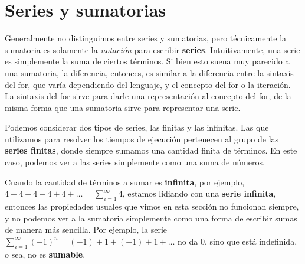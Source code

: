 \section{Series y sumatorias}
Generalmente no distinguimos entre series y sumatorias, pero técnicamente la sumatoria es solamente la \textit{notación} para escribir \textbf{series}. Intuitivamente, una serie es simplemente la suma de ciertos términos. Si bien esto suena muy parecido a una sumatoria, la diferencia, entonces, es similar a la diferencia entre la sintaxis del for, que varía dependiendo del lenguaje, y el concepto del for o la iteración. La sintaxis del for sirve para darle una representación al concepto del for, de la misma forma que una sumatoria sirve para representar una serie.

Podemos considerar dos tipos de series, las finitas y las infinitas. Las que utilizamos para resolver los tiempos de ejecución pertenecen al grupo de las  \textbf{series finitas}, donde siempre sumamos una cantidad finita de términos. En este caso, podemos ver a las series simplemente como una suma de números.

Cuando la cantidad de términos a sumar es \textbf{infinita}, por ejemplo, $4+4+4+4+4+\dots = \sum_{i=1}^{\infty}{4}$, estamos lidiando con una \textbf{serie infinita}, entonces las propiedades usuales que vimos en esta sección no funcionan siempre, y no podemos ver a la sumatoria simplemente como una forma de escribir sumas de manera más sencilla. Por ejemplo, la serie $\sum_{i=1}^{\infty}{(-1)^n}= (-1) + 1 + (-1) + 1 + \dots$ no da 0, sino que está indefinida, o sea, no es \textbf{sumable}. 